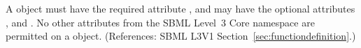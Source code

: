 A \FunctionDefinition object must have the required attribute ,
and may have the optional attributes ,  and
.  No other attributes from the SBML Level~3 Core namespace are
permitted on a \FunctionDefinition object.  (References: SBML L3V1
Section~\ref{sec:functiondefinition}.)
